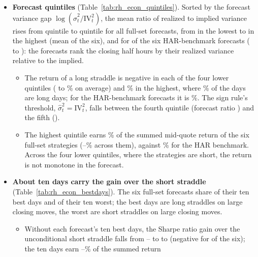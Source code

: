 \begin{itemize}
  variance on \rhedLongHitMin--\rhedLongHitMax\% of them, against \rhedUncRVAboveIV\% of all days, yet the long
  straddle has a positive return on only \rhedLongPosMin--\rhedLongPosMax\% of its long days, so its mean return on
  those days comes from a few large moves.
\item \textbf{Forecast quintiles} (Table~\ref{tab:rh_econ_quintiles}). Sorted by the forecast variance gap
  $\log(\hat\sigma^2_t/\mathrm{IV}_t^2)$, the mean ratio of realized to implied variance rises from quintile to
  quintile for all \rhedQMonoN{} full-set forecasts, from \rhedQOneRVIV{} in the lowest to \rhedQFiveRVIV{} in the
  highest (mean of the six), and for \rhedHarQMonoN{} of the six HAR-benchmark forecasts (\rhedHarQOneRVIV{} to
  \rhedHarQFiveRVIV): the forecasts rank the closing half hours by their realized variance relative to the implied.
  \begin{itemize}
  \item The return of a long straddle is negative in each of the four lower quintiles (\rhedQLowRMin{} to
    \rhedQLowRMax\% on average) and \rhedQFiveR\% in the highest, where \rhedQFiveLong\% of the days are long days;
    for the HAR-benchmark forecasts it is \rhedHarQFiveR\%. The sign rule's threshold, $\hat\sigma^2_t =
    \mathrm{IV}_t^2$, falls between the fourth quintile (forecast ratio \rhedQFourFc) and the fifth
    (\rhedQFiveFc).
  \item The highest quintile earns \rhedQFiveShare\% of the summed mid-quote return of the six full-set strategies
    (\rhedQFiveShareRngMin--\rhedQFiveShareRngMax\% across them), against \rhedHarQFiveShare\% for the HAR benchmark.
    Across the four lower quintiles, where the strategies are short, the return is not monotone in the forecast.
  \end{itemize}
\item \textbf{About ten days carry the gain over the short straddle} (Table~\ref{tab:rh_econ_bestdays}). The six
  full-set forecasts share \rhedBestAllSix{} of their ten best days and \rhedWorstAllSix{} of their ten worst; the
  best days are long straddles on large closing moves, the worst are short straddles on large closing moves.
  \begin{itemize}
  \item Without each forecast's ten best days, the Sharpe ratio gain over the unconditional short straddle falls from
    \rhedDShortAllMin--\rhedDShortAllMax{} to \rhedDShortExBestMin{} to \rhedDShortExBestMax{} (negative for
    \rhedDShortExBestNeg{} of the six); the ten days earn \rhedBestShareMin--\rhedBestShareMax\% of the summed return

\end{itemize}
\end{itemize}
